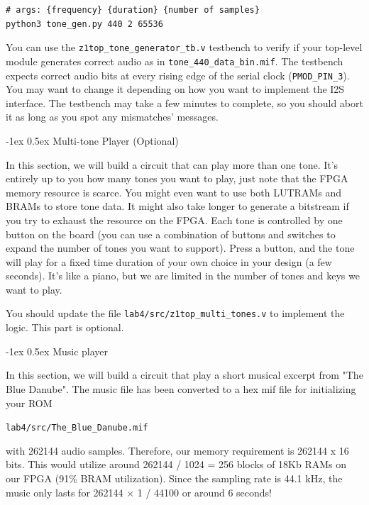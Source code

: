\documentclass[11pt]{article}
\makeatletter
\renewcommand{\subsection}
{\@startsection {subsection}{1}{0pt}
 {-1ex}
 {0.5ex}
 {\bfseries\normalsize}}
\makeatother
\begin{document}
\begin{verbatim}
# args: {frequency} {duration} {number of samples}
python3 tone_gen.py 440 2 65536
\end{verbatim}

You can use the \verb|z1top_tone_generator_tb.v| testbench to verify if your top-level module generates correct audio as in \verb|tone_440_data_bin.mif|. The testbench expects correct audio bits at every rising edge of the serial clock (\verb|PMOD_PIN_3|). You may want to change it depending on how you want to implement the I2S interface. The testbench may take a few minutes to complete, so you should abort it as long as you spot any mismatches' messages.
 
\subsection{Multi-tone Player (Optional)}

In this section, we will build a circuit that can play more than one tone. It's entirely up to you how many tones you want to play, just note that the FPGA memory resource is scarce. You might even want to use both LUTRAMs and BRAMs to store tone data. It might also take longer to generate a bitstream if you try to exhaust the resource on the FPGA. Each tone is controlled by one button on the board (you can use a combination of buttons and switches to expand the number of tones you want to support). Press a button, and the tone will play for a fixed time duration of your own choice in your design (a few seconds). It's like a piano, but we are limited in the number of tones and keys we want to play.

You should update the file \verb|lab4/src/z1top_multi_tones.v| to implement the logic. This part is optional.

\subsection{Music player}

In this section, we will build a circuit that play a short musical excerpt from "The Blue Danube". The music file has been converted to a hex mif file for initializing your ROM

\verb|lab4/src/The_Blue_Danube.mif|

with 262144 audio samples. Therefore, our memory requirement is 262144 x 16 bits. This would utilize around 262144 / 1024 = 256 blocks of 18Kb RAMs on our FPGA (91\% BRAM utilization). Since the sampling rate is 44.1 kHz, the music only lasts for 262144 $\times$ 1 / 44100 or around 6 seconds!
\end{document}
